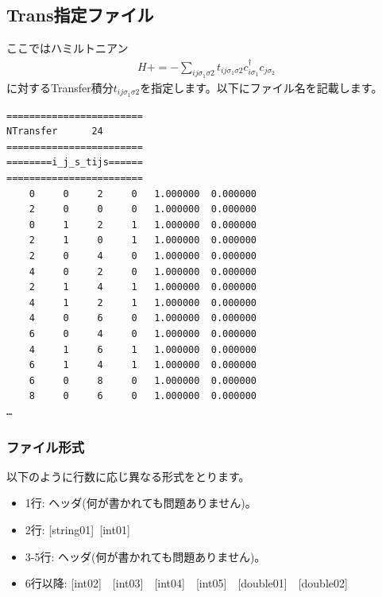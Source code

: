 \newpage
\subsection{Trans指定ファイル}
\label{Subsec:Trans}
ここではハミルトニアン
\begin{align}
H +=-\sum_{ij\sigma_1\sigma2} t_{ij\sigma_1\sigma2}c_{i\sigma_1}^{\dag}c_{j\sigma_2}
\end{align}
に対するTransfer積分$t_{ij\sigma_1\sigma2}$を指定します。以下にファイル名を記載します。\\
\begin{minipage}{12.5cm}
\begin{screen}
\begin{verbatim}
======================== 
NTransfer      24  
======================== 
========i_j_s_tijs====== 
======================== 
    0     0     2     0   1.000000  0.000000
    2     0     0     0   1.000000  0.000000
    0     1     2     1   1.000000  0.000000
    2     1     0     1   1.000000  0.000000
    2     0     4     0   1.000000  0.000000
    4     0     2     0   1.000000  0.000000
    2     1     4     1   1.000000  0.000000
    4     1     2     1   1.000000  0.000000
    4     0     6     0   1.000000  0.000000
    6     0     4     0   1.000000  0.000000
    4     1     6     1   1.000000  0.000000
    6     1     4     1   1.000000  0.000000
    6     0     8     0   1.000000  0.000000
    8     0     6     0   1.000000  0.000000
…
\end{verbatim}
\end{screen}
\end{minipage}

\subsubsection{ファイル形式}
以下のように行数に応じ異なる形式をとります。
 \begin{itemize}
   \item  1行:  ヘッダ(何が書かれても問題ありません)。
   \item  2行:   [string01]~[int01]
   \item  3-5行:  ヘッダ(何が書かれても問題ありません)。
   \item  6行以降: [int02]~~[int03]~~[int04]~~[int05]~~[double01]~~[double02] 
  \end{itemize}

